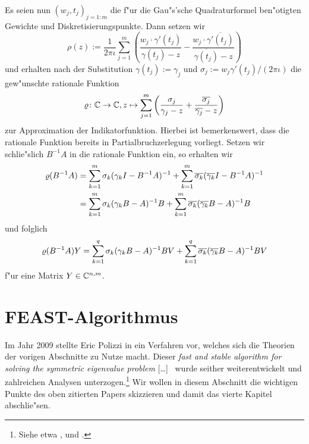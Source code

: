 \newpage

Es seien nun $(w_j, t_j)_{j=1:m}$
die f"ur die Gau"s'sche Quadraturformel ben"otigten Gewichte und Diskretisierungspunkte.
Dann setzen wir
\[
\rho(z) := \frac{1}{2\pi\iota}\sum_{j=1}^m \left(
\frac{w_j \cdot \gamma'(t_j)}{\gamma(t_j)-z} - \frac{w_j \cdot \overline{\gamma'(t_j)}}{\overline{\gamma(t_j)}-z}
\right)
\]
und erhalten nach der Substitution $\gamma(t_j) := \gamma_j$ und
$\sigma_j := w_j \gamma'(t_j) / (2\pi\iota)$ die gew"unschte rationale
Funktion
\[
\varrho\colon\mathbb{C}\to\mathbb{C}, z\mapsto\sum_{j=1}^m\left(\frac{\sigma_j}{\gamma_j - z} +
\frac{\overline{\sigma_j}}{\overline{\gamma_j} - z}\right)
\]
zur Approximation der Indikatorfunktion. Hierbei ist bemerkenswert, dass die
rationale Funktion bereits in Partialbruchzerlegung vorliegt. Setzen wir schlie"slich $B^{-1}A$ in die
rationale Funktion ein, so erhalten wir
\begin{align*}
\varrho(B^{-1}A) &= \sum_{k=1}^m \sigma_k (\gamma_k I - B^{-1}A)^{-1} +
\sum_{k=1}^m \overline{\sigma_k} (\overline{\gamma_k} I - B^{-1}A)^{-1}\\
&= \sum_{k=1}^m \sigma_k (\gamma_k B - A)^{-1} B +
\sum_{k=1}^m \overline{\sigma_k} (\overline{\gamma_k} B - A)^{-1} B
\end{align*}
und folglich
\[
\varrho(B^{-1}A)Y =
\sum_{k=1}^q \sigma_k (\gamma_k B - A)^{-1} BV +
\sum_{k=1}^q \overline{\sigma_k} (\overline{\gamma_k} B - A)^{-1} BV
\]
f"ur eine Matrix $Y\in\mathbb{C}^{n,m}$.

\section{FEAST-Algorithmus}

Im Jahr 2009 stellte Eric Polizzi in \cite{polizzi} ein Verfahren vor, welches sich die Theorien der vorigen Abschnitte zu Nutze macht. Dieser \glqq[\ldots] \emph{fast and stable algorithm for solving the symmetric eigenvalue problem} [\ldots]\grqq\ \cite[Abstract]{polizzi} wurde seither weiterentwickelt und zahlreichen Analysen unterzogen.\footnote{Siehe etwa \cite{ptep},\cite{kpt} und \cite{lzp}.}
Wir wollen in diesem Abschnitt die wichtigen Punkte des oben zitierten Papers skizzieren und damit das vierte Kapitel abschlie"sen.\\


